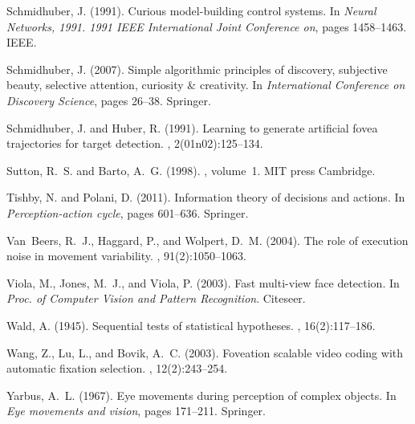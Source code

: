 \documentclass[12pt,twoside,openright]{article}
\begin{document}
\begin{thebibliography}{}
	Schmidhuber, J. (1991).
	\newblock Curious model-building control systems.
	\newblock In {\em Neural Networks, 1991. 1991 IEEE International Joint
		Conference on}, pages 1458--1463. IEEE.
	
	Schmidhuber, J. (2007).
	\newblock Simple algorithmic principles of discovery, subjective beauty,
	selective attention, curiosity \& creativity.
	\newblock In {\em International Conference on Discovery Science}, pages 26--38.
	Springer.
	
	Schmidhuber, J. and Huber, R. (1991).
	\newblock Learning to generate artificial fovea trajectories for target
	detection.
	, 2(01n02):125--134.
	
	Sutton, R.~S. and Barto, A.~G. (1998).
	, volume~1.
	\newblock MIT press Cambridge.
	
	Tishby, N. and Polani, D. (2011).
	\newblock Information theory of decisions and actions.
	\newblock In {\em Perception-action cycle}, pages 601--636. Springer.
	
	Van~Beers, R.~J., Haggard, P., and Wolpert, D.~M. (2004).
	\newblock The role of execution noise in movement variability.
	, 91(2):1050--1063.
	
	Viola, M., Jones, M.~J., and Viola, P. (2003).
	\newblock Fast multi-view face detection.
	\newblock In {\em Proc. of Computer Vision and Pattern Recognition}. Citeseer.
	
	Wald, A. (1945).
	\newblock Sequential tests of statistical hypotheses.
	, 16(2):117--186.
	
	Wang, Z., Lu, L., and Bovik, A.~C. (2003).
	\newblock Foveation scalable video coding with automatic fixation selection.
	, 12(2):243--254.
	
	Yarbus, A.~L. (1967).
	\newblock Eye movements during perception of complex objects.
	\newblock In {\em Eye movements and vision}, pages 171--211. Springer.
	
\end{thebibliography}

	
\end{document}

